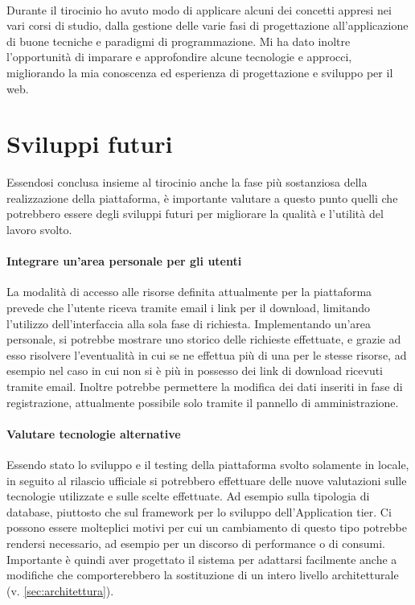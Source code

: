 \paragraph{}
Durante il tirocinio ho avuto modo di applicare alcuni dei concetti appresi nei
vari corsi di studio, dalla gestione delle varie fasi di progettazione
all'applicazione di buone tecniche e paradigmi di programmazione. Mi ha dato
inoltre l’opportunità di imparare e approfondire alcune tecnologie e approcci,
migliorando la mia conoscenza ed esperienza di progettazione e sviluppo per il web.



\section{Sviluppi futuri}
Essendosi conclusa insieme al tirocinio anche la fase più sostanziosa della
realizzazione della piattaforma, è importante valutare a questo punto quelli che
potrebbero essere degli sviluppi futuri per migliorare la qualità e l'utilità del
lavoro svolto.

\paragraph{Integrare un'area personale per gli utenti}
La modalità di accesso alle risorse definita attualmente per la piattaforma prevede
che l'utente riceva tramite email i link per il download, limitando l'utilizzo
dell'interfaccia alla sola fase di richiesta.
Implementando un'area personale, si potrebbe mostrare uno storico delle richieste
effettuate, e grazie ad esso risolvere l'eventualità in cui se ne effettua
più di una per le stesse risorse, ad esempio nel caso in cui non si è più in
possesso dei link di download ricevuti tramite email. Inoltre potrebbe permettere
la modifica dei dati inseriti in fase di registrazione, attualmente possibile solo
tramite il pannello di amministrazione.

\paragraph{Valutare tecnologie alternative}
Essendo stato lo sviluppo e il testing della piattaforma svolto solamente in locale,
in seguito al rilascio ufficiale si potrebbero effettuare delle nuove valutazioni
sulle tecnologie utilizzate e sulle scelte effettuate. Ad esempio sulla tipologia
di database, piuttosto che sul framework per lo sviluppo dell'Application tier.
Ci possono essere molteplici motivi per cui un cambiamento di questo tipo
potrebbe rendersi necessario, ad esempio per un discorso di performance o di
consumi. Importante è quindi aver progettato il sistema per adattarsi facilmente
anche a modifiche che comporterebbero la sostituzione di un intero livello
architetturale (v. \autoref{sec:architettura}).

